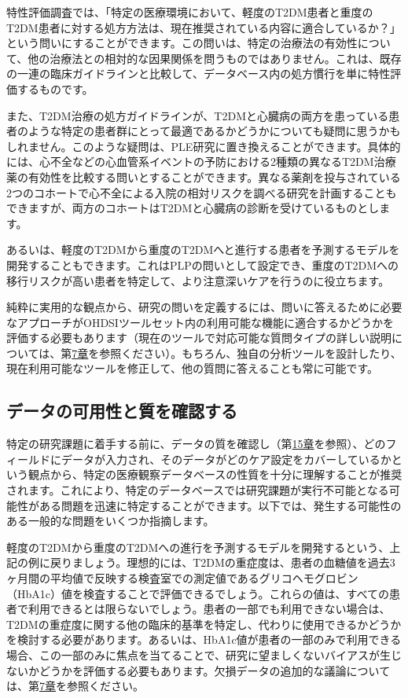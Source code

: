 \documentclass[
  11pt]{book}
\theoremstyle{definition}
\theoremstyle{definition}
\theoremstyle{definition}
\theoremstyle{definition}
\theoremstyle{remark}
\begin{document}
特性評価調査では、「特定の医療環境において、軽度のT2DM患者と重度のT2DM患者に対する処方方法は、現在推奨されている内容に適合しているか？」という問いにすることができます。この問いは、特定の治療法の有効性について、他の治療法との相対的な因果関係を問うものではありません。これは、既存の一連の臨床ガイドラインと比較して、データベース内の処方慣行を単に特性評価するものです。

また、T2DM治療の処方ガイドラインが、T2DMと心臓病の両方を患っている患者のような特定の患者群にとって最適であるかどうかについても疑問に思うかもしれません。このような疑問は、PLE研究に置き換えることができます。具体的には、心不全などの心血管系イベントの予防における2種類の異なるT2DM治療薬の有効性を比較する問いとすることができます。異なる薬剤を投与されている2つのコホートで心不全による入院の相対リスクを調べる研究を計画することもできますが、両方のコホートはT2DMと心臓病の診断を受けているものとします。

あるいは、軽度のT2DMから重度のT2DMへと進行する患者を予測するモデルを開発することもできます。これはPLPの問いとして設定でき、重度のT2DMへの移行リスクが高い患者を特定して、より注意深いケアを行うのに役立ちます。

純粋に実用的な観点から、研究の問いを定義するには、問いに答えるために必要なアプローチがOHDSIツールセット内の利用可能な機能に適合するかどうかを評価する必要もあります（現在のツールで対応可能な質問タイプの詳しい説明については、第\href{https://ohdsi.github.io/TheBookOfOhdsi/DataAnalyticsUseCases.html\#DataAnalyticsUseCases}{7章}を参照ください）。もちろん、独自の分析ツールを設計したり、現在利用可能なツールを修正して、他の質問に答えることも常に可能です。

\subsection{データの可用性と質を確認する}\label{ux30c7ux30fcux30bfux306eux53efux7528ux6027ux3068ux8ceaux3092ux78baux8a8dux3059ux308b}

特定の研究課題に着手する前に、データの質を確認し（第\href{https://ohdsi.github.io/TheBookOfOhdsi/DataQuality.html\#DataQuality}{15章}を参照）、どのフィールドにデータが入力され、そのデータがどのケア設定をカバーしているかという観点から、特定の医療観察データベースの性質を十分に理解することが推奨されます。これにより、特定のデータベースでは研究課題が実行不可能となる可能性がある問題を迅速に特定することができます。以下では、発生する可能性のある一般的な問題をいくつか指摘します。

軽度のT2DMから重度のT2DMへの進行を予測するモデルを開発するという、上記の例に戻りましょう。理想的には、T2DMの重症度は、患者の血糖値を過去3ヶ月間の平均値で反映する検査室での測定値であるグリコヘモグロビン（HbA1c）値を検査することで評価できるでしょう。これらの値は、すべての患者で利用できるとは限らないでしょう。患者の一部でも利用できない場合は、T2DMの重症度に関する他の臨床的基準を特定し、代わりに使用できるかどうかを検討する必要があります。あるいは、HbA1c値が患者の一部のみで利用できる場合、この一部のみに焦点を当てることで、研究に望ましくないバイアスが生じないかどうかを評価する必要もあります。欠損データの追加的な議論については、第\href{https://ohdsi.github.io/TheBookOfOhdsi/DataAnalyticsUseCases.html\#DataAnalyticsUseCases}{7章}を参照ください。
\end{document}
